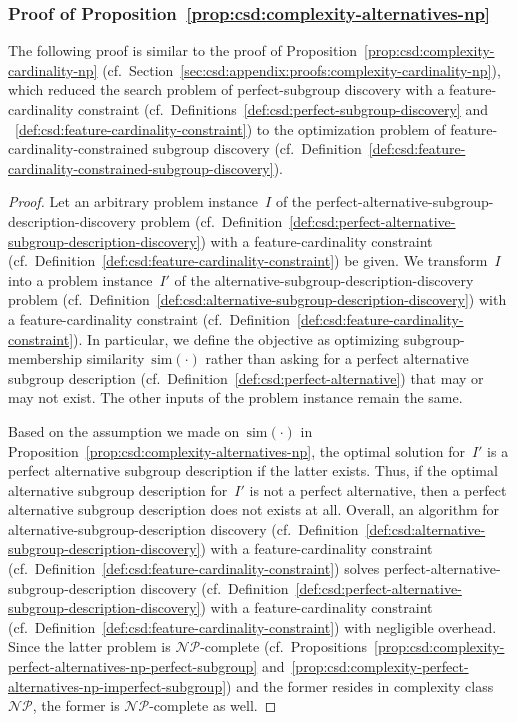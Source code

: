 \documentclass{article}
\theoremstyle{definition}
\begin{document}
\subsubsection{Proof of Proposition~\ref{prop:csd:complexity-alternatives-np}}
\label{sec:csd:appendix:proofs:complexity-alternatives-np}

The following proof is similar to the proof of Proposition~\ref{prop:csd:complexity-cardinality-np}
(cf.~Section~\ref{sec:csd:appendix:proofs:complexity-cardinality-np}), which reduced the search problem of perfect-subgroup discovery with a feature-cardinality constraint (cf.~Definitions~\ref{def:csd:perfect-subgroup-discovery} and ~\ref{def:csd:feature-cardinality-constraint}) to the optimization problem of feature-cardinality-constrained subgroup discovery (cf.~Definition~\ref{def:csd:feature-cardinality-constrained-subgroup-discovery}).
%
\begin{proof}
Let an arbitrary problem instance~$I$ of the perfect-alternative-subgroup-description-discovery problem (cf.~Definition~\ref{def:csd:perfect-alternative-subgroup-description-discovery}) with a feature-cardinality constraint (cf.~Definition~\ref{def:csd:feature-cardinality-constraint}) be given.
We transform~$I$ into a problem instance~$I'$ of the alternative-subgroup-description-discovery problem (cf.~Definition~\ref{def:csd:alternative-subgroup-description-discovery}) with a feature-cardinality constraint (cf.~Definition~\ref{def:csd:feature-cardinality-constraint}).
In particular, we define the objective as optimizing subgroup-membership similarity~$\text{sim}(\cdot)$ rather than asking for a perfect alternative subgroup description (cf.~Definition~\ref{def:csd:perfect-alternative}) that may or may not exist.
The other inputs of the problem instance remain the same.

Based on the assumption we made on~$\text{sim}(\cdot)$ in Proposition~\ref{prop:csd:complexity-alternatives-np}, the optimal solution for~$I'$ is a perfect alternative subgroup description if the latter exists.
Thus, if the optimal alternative subgroup description for~$I'$ is not a perfect alternative, then a perfect alternative subgroup description does not exists at all.
Overall, an algorithm for alternative-subgroup-description discovery (cf.~Definition~\ref{def:csd:alternative-subgroup-description-discovery}) with a feature-cardinality constraint (cf.~Definition~\ref{def:csd:feature-cardinality-constraint}) solves perfect-alternative-subgroup-description discovery (cf.~Definition~\ref{def:csd:perfect-alternative-subgroup-description-discovery}) with a feature-cardinality constraint (cf.~Definition~\ref{def:csd:feature-cardinality-constraint}) with negligible overhead.
Since the latter problem is $\mathcal{NP}$-complete (cf.~Propositions~\ref{prop:csd:complexity-perfect-alternatives-np-perfect-subgroup} and~\ref{prop:csd:complexity-perfect-alternatives-np-imperfect-subgroup}) and the former resides in complexity class $\mathcal{NP}$, the former is $\mathcal{NP}$-complete as well.
\end{proof}

\renewcommand*{\bibfont}{\small} %
\printbibliography
\end{document}
